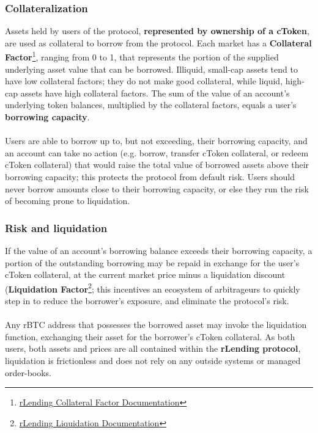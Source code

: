 \documentclass{article}
\begin{document}
\subsubsection{Collateralization}
Assets held by users of the protocol, \textbf{represented by ownership of a cToken}, are used as collateral to borrow from the protocol. Each market has a \textbf{Collateral Factor}\footnote{\href{https://test.rlending.app/docs/keyConcepts\#ctokens}{rLending Collateral Factor Documentation}}, ranging from 0 to 1, that represents the portion of the supplied underlying asset value that can be borrowed. Illiquid, small-cap assets tend to have low collateral factors; they do not make good collateral, while liquid, high-cap assets have high collateral factors. The sum of the value of an account's underlying token balances, multiplied by the collateral factors, equals a user's \textbf{borrowing capacity}.
\\
\\
Users are able to borrow up to, but not exceeding, their borrowing capacity, and an account can
take no action (e.g. borrow, transfer cToken collateral, or redeem cToken collateral) that would
raise the total value of borrowed assets above their borrowing capacity; this protects the protocol
from default risk. Users should never borrow amounts close to their borrowing capacity, or else they run the risk of becoming prone to liquidation.

\subsubsection{Risk and liquidation}
If the value of an account's borrowing balance exceeds their borrowing capacity, a portion of
the outstanding borrowing may be repaid in exchange for the user's cToken collateral, at the current market price minus a liquidation discount (\textbf{Liquidation Factor}\footnote{\href{https://test.rlending.app/docs/keyConcepts\#liquidation}{rLending Liquidation Documentation}}; this incentives an ecosystem of arbitrageurs to quickly step in to reduce the borrower's exposure, and eliminate the protocol's risk.
\\ \\
Any rBTC address that possesses the borrowed asset may invoke the liquidation function, exchanging their asset for the borrower's cToken collateral. As both users, both assets and prices
are all contained within the \textbf{rLending protocol}, liquidation is frictionless and does not rely on any outside systems or managed order-books.
\end{document}
